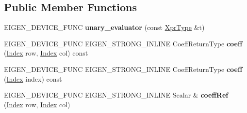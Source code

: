 \subsection*{Public Member Functions}
\begin{DoxyCompactItemize}
\item 
\mbox{\label{struct_eigen_1_1internal_1_1unary__evaluator_3_01_transpose_3_01_arg_type_01_4_00_01_index_based_01_4_aec69cebae400376763e83decca015af7}} 
E\+I\+G\+E\+N\+\_\+\+D\+E\+V\+I\+C\+E\+\_\+\+F\+U\+NC {\bfseries unary\+\_\+evaluator} (const \hyperlink{group___core___module_class_eigen_1_1_transpose}{Xpr\+Type} \&t)
\item 
\mbox{\label{struct_eigen_1_1internal_1_1unary__evaluator_3_01_transpose_3_01_arg_type_01_4_00_01_index_based_01_4_a123bd0c154402081cd60e6af83590024}} 
E\+I\+G\+E\+N\+\_\+\+D\+E\+V\+I\+C\+E\+\_\+\+F\+U\+NC E\+I\+G\+E\+N\+\_\+\+S\+T\+R\+O\+N\+G\+\_\+\+I\+N\+L\+I\+NE Coeff\+Return\+Type {\bfseries coeff} (\hyperlink{namespace_eigen_a62e77e0933482dafde8fe197d9a2cfde}{Index} row, \hyperlink{namespace_eigen_a62e77e0933482dafde8fe197d9a2cfde}{Index} col) const
\item 
\mbox{\label{struct_eigen_1_1internal_1_1unary__evaluator_3_01_transpose_3_01_arg_type_01_4_00_01_index_based_01_4_aef9506dd163d2f0c59da29512949a9d8}} 
E\+I\+G\+E\+N\+\_\+\+D\+E\+V\+I\+C\+E\+\_\+\+F\+U\+NC E\+I\+G\+E\+N\+\_\+\+S\+T\+R\+O\+N\+G\+\_\+\+I\+N\+L\+I\+NE Coeff\+Return\+Type {\bfseries coeff} (\hyperlink{namespace_eigen_a62e77e0933482dafde8fe197d9a2cfde}{Index} index) const
\item 
\mbox{\label{struct_eigen_1_1internal_1_1unary__evaluator_3_01_transpose_3_01_arg_type_01_4_00_01_index_based_01_4_a36722e85b94a79ba766ddc2920b48712}} 
E\+I\+G\+E\+N\+\_\+\+D\+E\+V\+I\+C\+E\+\_\+\+F\+U\+NC E\+I\+G\+E\+N\+\_\+\+S\+T\+R\+O\+N\+G\+\_\+\+I\+N\+L\+I\+NE Scalar \& {\bfseries coeff\+Ref} (\hyperlink{namespace_eigen_a62e77e0933482dafde8fe197d9a2cfde}{Index} row, \hyperlink{namespace_eigen_a62e77e0933482dafde8fe197d9a2cfde}{Index} col)

\end{DoxyCompactItemize}
